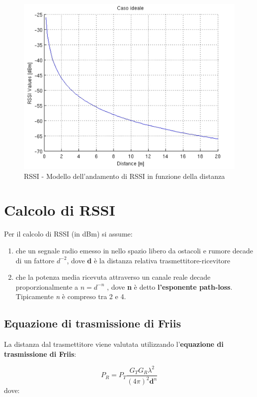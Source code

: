 \begin{figure}[!ht]
	\centering
	\includegraphics[scale=.25]{img/algoritmi/RSS.png}
	\caption{RSSI - Modello dell'andamento di RSSI in funzione della distanza}
\end{figure}



\section{Calcolo di RSSI}
Per il calcolo di RSSI (in dBm) si assume:
\begin{enumerate}
	\item che un segnale radio emesso in nello spazio libero da ostacoli e rumore decade di un fattore $ d^{-2} $, dove \textbf{d} è la distanza relativa trasmettitore-ricevitore
	
	\item che la potenza media ricevuta attraverso un canale reale decade proporzionalmente a $ n = d^{-n} $ , dove \textbf{n} è detto \textbf{l’esponente path-loss}. Tipicamente \textit{n} è compreso tra 2 e 4.
\end{enumerate}

\subsection{Equazione di trasmissione di Friis}

La distanza dal trasmettitore viene valutata utilizzando l’\textbf{equazione di trasmissione di Friis}:

\begin{equation}\label{eq:potenza_ricevuta}
P_R = P_T \frac{G_T G_R  \lambda^2}{(4 \pi)^2 \textbf{d}^n}
\end{equation}
dove:

